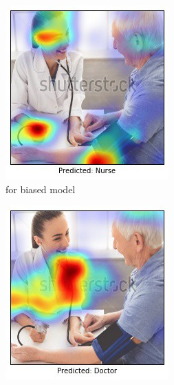 \begin{figure}[ht!]
\begin{center}
\begin{subfigure}[b]{0.32\linewidth}
        \includegraphics[width=1\linewidth]{figures/71_gcam_incorr_unbalanced.jpg}
		\caption{\tiny{\gcam{} for biased model}}
        \vspace{10pt}
    \end{subfigure}
    \begin{subfigure}[b]{0.32\linewidth}
        \centering
        \includegraphics[width=1\linewidth]{figures/71_gcam_corr_balanced.jpg}

\end{subfigure}
\end{center}
\end{figure}
